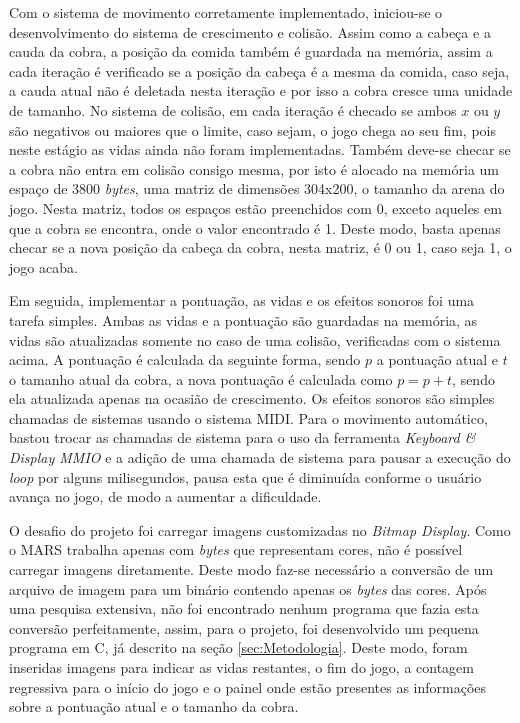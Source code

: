 \documentclass[a4paper]{sbgames}
\begin{document}
{{Com o sistema de movimento corretamente implementado, iniciou-se o desenvolvimento do sistema de crescimento e colisão. Assim como a cabeça e a cauda da cobra, a posição da comida também é guardada na memória, assim a cada iteração é verificado se a posição da cabeça é a mesma da comida, caso seja, a cauda atual não é deletada nesta iteração e por isso a cobra cresce uma unidade de tamanho. No sistema de colisão, em cada iteração é checado se ambos $x$ ou $y$ são negativos ou maiores que o limite, caso sejam, o jogo chega ao seu fim, pois neste estágio as vidas ainda não foram implementadas. Também deve-se checar se a cobra não entra em colisão consigo mesma, por isto é alocado na memória um espaço de 3800 \textit{bytes}, uma matriz de dimensões 304x200, o tamanho da arena do jogo. Nesta matriz, todos os espaços estão preenchidos com 0, exceto aqueles em que a cobra se encontra, onde o valor encontrado é 1. Deste modo, basta apenas checar se a nova posição da cabeça da cobra, nesta matriz, é 0 ou 1, caso seja 1, o jogo acaba.

Em seguida, implementar a pontuação, as vidas e os efeitos sonoros foi uma tarefa simples. Ambas as vidas e a pontuação são guardadas na memória, as vidas são atualizadas somente no caso de uma colisão, verificadas com o sistema acima. A pontuação é calculada da seguinte forma, sendo $p$ a pontuação atual e $t$ o tamanho atual da cobra, a nova pontuação é calculada como $p = p + t$, sendo ela atualizada apenas na ocasião de crescimento. Os efeitos sonoros são simples chamadas de sistemas usando o sistema MIDI. Para o movimento automático, bastou trocar as chamadas de sistema para o uso da ferramenta  \textit{Keyboard \& Display MMIO} e a adição de uma chamada de sistema para pausar a execução do \textit{loop} por alguns milisegundos, pausa esta que é diminuída conforme o usuário avança no jogo, de modo a aumentar a dificuldade.

O desafio do projeto foi carregar imagens customizadas no \textit{Bitmap Display}. Como o MARS trabalha apenas com \textit{bytes} que representam cores, não é possível carregar imagens diretamente. Deste modo faz-se necessário a conversão de um arquivo de imagem para um binário contendo apenas os \textit{bytes} das cores. Após uma pesquisa extensiva, não foi encontrado nenhum programa que fazia esta conversão perfeitamente, assim, para o projeto, foi desenvolvido um pequena programa em C, já descrito na seção \ref{sec:Metodologia}. Deste modo, foram inseridas imagens para indicar as vidas restantes, o fim do jogo, a contagem regressiva para o início do jogo e o painel onde estão presentes as informações sobre a pontuação atual e o tamanho da cobra.

}}
\end{document}
